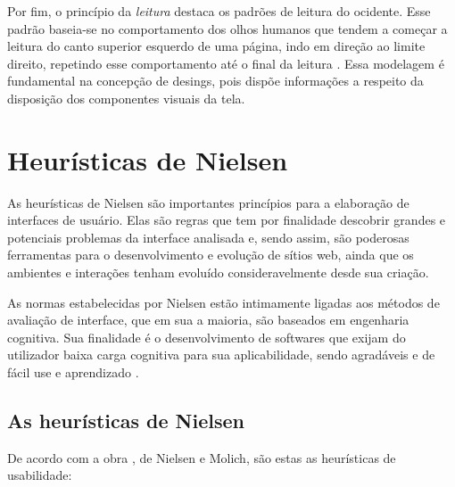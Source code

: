 Por fim, o princípio da \textit{leitura} destaca os padrões de leitura do ocidente. Esse padrão baseia-se no comportamento dos olhos humanos que tendem a começar a leitura do canto superior esquerdo de uma página, indo em direção ao limite direito, repetindo esse comportamento até o final da leitura \cite{lidwell2010}. Essa modelagem é fundamental na concepção de desings, pois dispõe informações a respeito da disposição dos componentes visuais da tela.

\section{Heurísticas de Nielsen}

As heurísticas de Nielsen são importantes princípios para a elaboração de interfaces de usuário. Elas são regras que tem por finalidade descobrir grandes e potenciais problemas da interface analisada \cite{nielsen1994usability} e, sendo assim, são poderosas ferramentas para o desenvolvimento e evolução de sítios web, ainda que os ambientes e interações tenham evoluído consideravelmente desde sua criação.

As normas estabelecidas por Nielsen estão intimamente ligadas aos métodos de avaliação de interface, que em sua a maioria, são baseados em engenharia cognitiva. Sua finalidade é o desenvolvimento de softwares que exijam do utilizador baixa carga cognitiva para sua aplicabilidade, sendo agradáveis e de fácil use e aprendizado \cite{maciel2004avaliacao}.

\subsection{As heurísticas de Nielsen}

De acordo com a obra \cite{nielsen1994usability}, de Nielsen e Molich, são estas as heurísticas de usabilidade:


